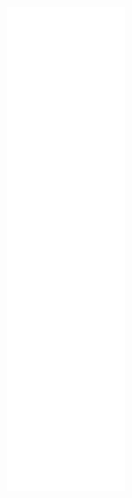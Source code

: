 \begin{figure}[H]
\begin{center}
\leavevmode
\includegraphics[height=400pt]{classHoldStateHandler__coll__graph}
\end{center}
\end{figure}

